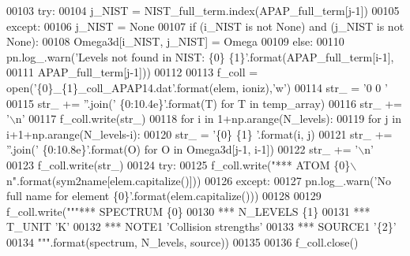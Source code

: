 \begin{DoxyCode}
00103         \textcolor{keywordflow}{try}:
00104             j\_NIST = NIST\_full\_term.index(APAP\_full\_term[j-1])
00105         \textcolor{keywordflow}{except}:
00106             j\_NIST = \textcolor{keywordtype}{None}
00107         \textcolor{keywordflow}{if} (i\_NIST \textcolor{keywordflow}{is} \textcolor{keywordflow}{not} \textcolor{keywordtype}{None}) \textcolor{keywordflow}{and} (j\_NIST \textcolor{keywordflow}{is} \textcolor{keywordflow}{not} \textcolor{keywordtype}{None}):
00108             Omega3d[i\_NIST, j\_NIST] = Omega
00109         \textcolor{keywordflow}{else}:
00110             pn.log\_.warn(\textcolor{stringliteral}{'Levels not found in NIST: \{0\} \{1\}'}.format(APAP\_full\_term[i-1], 
00111                                                                     APAP\_full\_term[j-1]))
00112             
00113     f\_coll = open(\textcolor{stringliteral}{'\{0\}\_\{1\}\_coll\_APAP14.dat'}.format(elem, ioniz),\textcolor{stringliteral}{'w'})
00114     str\_ = \textcolor{stringliteral}{'0   0 '}
00115     str\_ += \textcolor{stringliteral}{''}.join(\textcolor{stringliteral}{' \{0:10.4e\}'}.format(T) \textcolor{keywordflow}{for} T \textcolor{keywordflow}{in} temp\_array)
00116     str\_ += \textcolor{stringliteral}{'\(\backslash\)n'}
00117     f\_coll.write(str\_)
00118     \textcolor{keywordflow}{for} i \textcolor{keywordflow}{in} 1+np.arange(N\_levels):
00119         \textcolor{keywordflow}{for} j \textcolor{keywordflow}{in} i+1+np.arange(N\_levels-i):
00120             str\_ = \textcolor{stringliteral}{'\{0\} \{1\} '}.format(i, j)
00121             str\_ += \textcolor{stringliteral}{''}.join(\textcolor{stringliteral}{' \{0:10.8e\}'}.format(O) \textcolor{keywordflow}{for} O \textcolor{keywordflow}{in} Omega3d[j-1, i-1])
00122             str\_ += \textcolor{stringliteral}{'\(\backslash\)n'}
00123             f\_coll.write(str\_)
00124     \textcolor{keywordflow}{try}:
00125         f\_coll.write(\textcolor{stringliteral}{"*** ATOM \{0\}\(\backslash\)n"}.format(sym2name[elem.capitalize()]))
00126     \textcolor{keywordflow}{except}:
00127         pn.log\_.warn(\textcolor{stringliteral}{'No full name for element \{0\}'}.format(elem.capitalize()))
00128 
00129     f\_coll.write(\textcolor{stringliteral}{"""*** SPECTRUM \{0\}}
00130 \textcolor{stringliteral}{*** N\_LEVELS \{1\}}
00131 \textcolor{stringliteral}{*** T\_UNIT 'K'}
00132 \textcolor{stringliteral}{*** NOTE1 'Collision strengths'}
00133 \textcolor{stringliteral}{*** SOURCE1 '\{2\}'}
00134 \textcolor{stringliteral}{"""}.format(spectrum, N\_levels, source))
00135     
00136     f\_coll.close()

\end{DoxyCode}
